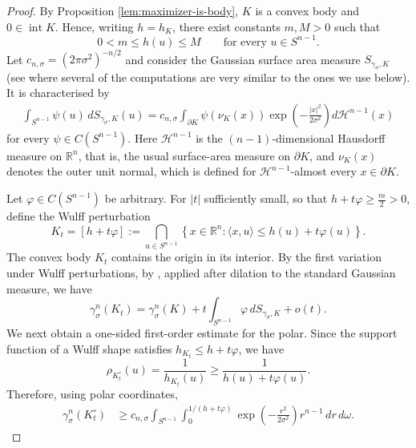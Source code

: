 \documentclass[12pt,oneside,reqno]{amsart}
\numberwithin{equation}{section}
\theoremstyle{remark}
\newcommand{\R}{\mathbb R}
\begin{document}
\begin{proof}
By Proposition \ref{lem:maximizer-is-body}, \(K\) is a convex
body and \(0\in\operatorname{int}K\). Hence, writing
\(h=h_K\), there exist constants \(m,M>0\) such that
\[
    0<m\le h(u)\le M
    \qquad
    \text{for every }u\in S^{n-1}.
\]
Let $c_{n,\sigma}=(2\pi\sigma^2)^{-n/2}$ and consider the Gaussian surface area measure
\(S_{\gamma_\sigma,K}\) (see \cite{huang2021minkowski} where several of the computations are very similar to the ones we use below). It is characterised by
\begin{align}\label{eq:GaussSurfaceAreaMeasure}
     \int_{ S^{n-1}}\psi(u)\,
        dS_{\gamma_\sigma,K}(u)
    =
    c_{n,\sigma}
    \int_{\partial K}
        \psi(\nu_K(x))
        \exp\left(-\frac{|x|^2}{2\sigma^2}\right)
        d\mathcal H^{n-1}(x)
\end{align}
for every \(\psi\in C( S^{n-1})\). Here \(\mathcal H^{n-1}\) is the $(n-1)$-dimensional Hausdorff measure on $\R^{n}$, that is, the usual surface-area measure on \(\partial K\), and
\(\nu_K(x)\) denotes the outer unit normal, which is defined
for \(\mathcal H^{n-1}\)-almost every \(x\in\partial K\).

Let \(\varphi\in C(S^{n-1})\) be arbitrary. For
\(|t|\) sufficiently small, so that $h+t\varphi\ge \frac m2>0$, define the Wulff perturbation
\[
    K_t
    =
    [h+t\varphi]
    :=
    \bigcap_{u\in S^{n-1}}
    \left\{
       x\in\mathbb R^n:
       \langle x,u\rangle\le h(u)+t\varphi(u)
    \right\}.
\]
 The convex body \(K_t\) contains the origin
in its interior. By the first variation under Wulff
perturbations, by \cite[Theorem~3.3]{huang2021minkowski}, applied after
dilation to the standard Gaussian measure, we have
\begin{equation}
\label{eq:first-variation-K}
    \gamma_\sigma^n(K_t)
    =
    \gamma_\sigma^n(K) +  t\int_{ S^{n-1}}
        \varphi\,dS_{\gamma_\sigma,K}
    +o(t).
\end{equation}
We next obtain a one-sided first-order estimate for the polar. Since the support function of a Wulff shape satisfies $h_{K_t}\le h+t\varphi$,
we have
\[
    \rho_{K_t^\circ}(u)
    =
    \frac{1}{h_{K_t}(u)}
    \ge
    \frac{1}{h(u)+t\varphi(u)}.
\]
Therefore, using polar coordinates,
\[
\begin{aligned}
    \gamma_\sigma^n(K_t^\circ)
    &\ge
    c_{n,\sigma}
    \int_{ S^{n-1}}
    \int_0^{1/(h+t\varphi)}
        \exp\left(-\frac{r^2}{2\sigma^2}\right)
        r^{n-1}\,dr\,d\omega.
\end{aligned}
\]


\end{proof}
\end{document}
